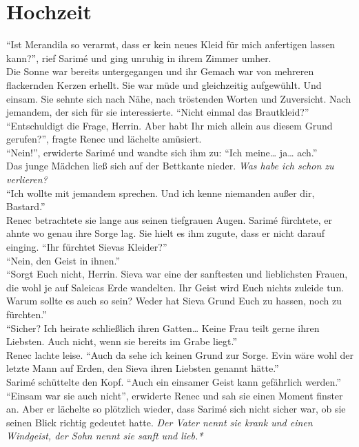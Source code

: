 \chapter{Hochzeit}

``Ist Merandila so verarmt, dass er kein neues Kleid für mich anfertigen lassen kann?'', rief 
Sarimé und ging unruhig in ihrem Zimmer umher. \\ 
Die Sonne war bereits untergegangen und ihr Gemach war von mehreren flackernden Kerzen erhellt. Sie 
war müde und gleichzeitig aufgewühlt. Und einsam. Sie sehnte sich nach Nähe, nach tröstenden Worten 
und Zuversicht. Nach jemandem, der sich für sie interessierte. ``Nicht einmal das Brautkleid?''\\
``Entschuldigt die Frage, Herrin. Aber habt Ihr mich allein aus diesem Grund gerufen?'', fragte 
Renec und lächelte amüsiert.\\
``Nein!'', erwiderte Sarimé und wandte sich ihm zu: ``Ich meine… ja… ach.''\\
Das junge Mädchen ließ sich auf der Bettkante nieder. \textit{Was habe ich schon zu 
verlieren?} \\
``Ich wollte mit jemandem sprechen. Und ich kenne niemanden außer dir, Bastard.''\\
Renec betrachtete sie lange aus seinen tiefgrauen Augen. Sarimé fürchtete, er ahnte wo genau ihre 
Sorge lag. Sie hielt es ihm zugute, dass er nicht darauf einging. ``Ihr fürchtet Sievas Kleider?''\\
``Nein, den Geist in ihnen.''\\
``Sorgt Euch nicht, Herrin. Sieva war eine der sanftesten und lieblichsten Frauen, die wohl je auf 
Saleicas Erde wandelten. Ihr Geist wird Euch nichts zuleide tun. Warum sollte es auch so sein? 
Weder hat Sieva Grund Euch zu hassen, noch zu fürchten.''\\
``Sicher? Ich heirate schließlich ihren Gatten… Keine Frau teilt gerne ihren Liebsten. Auch nicht, 
wenn sie bereits im Grabe liegt.''\\
Renec lachte leise. ``Auch da sehe ich keinen Grund zur Sorge. Evin wäre wohl der letzte Mann auf 
Erden, den Sieva ihren Liebsten genannt hätte.''\\
Sarimé schüttelte den Kopf. ``Auch ein einsamer Geist kann gefährlich werden.''\\
``Einsam war sie auch nicht'', erwiderte Renec und sah sie einen Moment finster an. Aber er 
lächelte so plötzlich wieder, dass Sarimé sich nicht sicher war, ob sie seinen Blick richtig 
gedeutet hatte.
\textit{Der Vater nennt sie krank und einen Windgeist, der Sohn nennt sie sanft und lieb.*}\\
